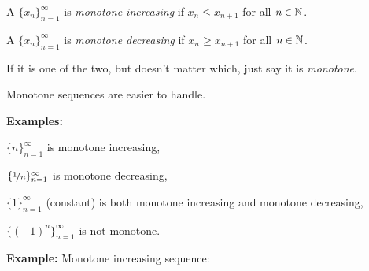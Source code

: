\documentclass[10pt,aspectratio=149]{beamer}
\begin{document}
\begin{frame}
\begin{definition}
A $\{ x_n \}_{n=1}^\infty$ is \emph{monotone increasing} if $x_n \leq x_{n+1}$ for all $n \in {\mathbb{N}}$.  

\pause
A $\{ x_n \}_{n=1}^\infty$ is \emph{monotone decreasing} if $x_n \geq x_{n+1}$ for all $n \in {\mathbb{N}}$.  

\pause
If it is one of the two, but doesn't matter which, just say it is \emph{monotone}.
\end{definition}

\pause

Monotone sequences are easier to handle.

\medskip
\pause

\textbf{Examples:}

\pause
$\{ n \}_{n=1}^\infty$ is monotone increasing,

\pause
$\{ \nicefrac{1}{n} \}_{n=1}^\infty$ is monotone decreasing,

\pause
$\{ 1 \}_{n=1}^\infty$ (constant) is both monotone increasing and monotone decreasing,

\pause
$\{ {(-1)}^n \}_{n=1}^\infty$ is not monotone.

\end{frame}

\begin{frame}
\textbf{Example:} Monotone increasing sequence:

\begin{center}
\end{center}

\end{frame}
\end{document}
